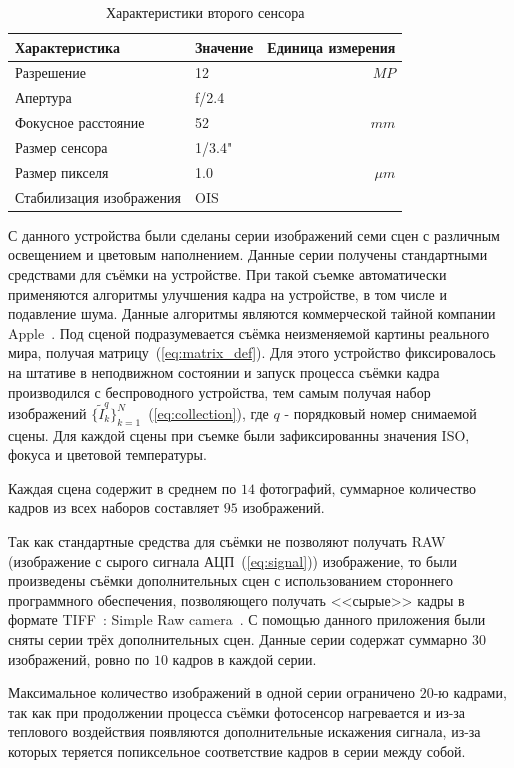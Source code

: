 \documentclass[14pt]{mmcs_article}
\begin{document}
\begin{table}[h!]
	\centering
	\caption{\label{tab:cam2}Характеристики второго сенсора}
	\begin{tabular}{llr}
		\hline
		Характеристика  & Значение    & Единица измерения \\
		\hline
		Разрешение & 12    & $MP$  \\
		Апертура & f/2.4 & \\
		Фокусное расстояние & 52 & $mm$ \\
		Размер сенсора & 1/3.4" & \\
		Размер пикселя & 1.0 & $\mu m$ \\
		Стабилизация изображения & OIS & \\
		 \hline
	\end{tabular}
\end{table}

С данного устройства были сделаны серии изображений семи сцен с различным освещением и цветовым наполнением. Данные серии получены стандартными средствами для съёмки на устройстве. При такой съемке автоматически применяются алгоритмы улучшения кадра на устройстве, в том числе и подавление шума. Данные алгоритмы являются коммерческой тайной компании Apple~\autocite{APPLElink}. Под сценой подразумевается съёмка неизменяемой картины реального мира, получая матрицу~(\ref{eq:matrix_def}). Для этого устройство фиксировалось на штативе в неподвижном состоянии  и запуск процесса съёмки кадра производился  с беспроводного устройства, тем самым получая набор изображений $\{\tilde{I}^q_k\}_{k=1}^{N}$~(\ref{eq:collection}), где $q$ - порядковый номер снимаемой сцены. Для каждой сцены при съемке были зафиксированны значения ISO, фокуса и цветовой температуры. 

Каждая сцена содержит в среднем по $14$ фотографий, суммарное количество кадров из всех наборов составляет $95$ изображений.


Так как стандартные средства для съёмки не позволяют получать RAW (изображение с сырого сигнала АЦП~(\ref{eq:signal})) изображение, то были произведены съёмки дополнительных сцен с использованием стороннего программного обеспечения, позволяющего получать <<сырые>>  кадры в формате TIFF~\autocite{TIFFArticle}: Simple Raw camera~\autocite{RAWCamera}. С помощью данного приложения были сняты серии трёх дополнительных сцен. Данные серии содержат суммарно $30$ изображений, ровно по $10$ кадров в каждой серии.

Максимальное количество изображений в одной серии ограничено $20$-ю кадрами, так как при продолжении процесса съёмки фотосенсор нагревается и из-за теплового воздействия появляются дополнительные искажения сигнала, из-за которых теряется попиксельное соответствие кадров в серии между собой.
\end{document}
